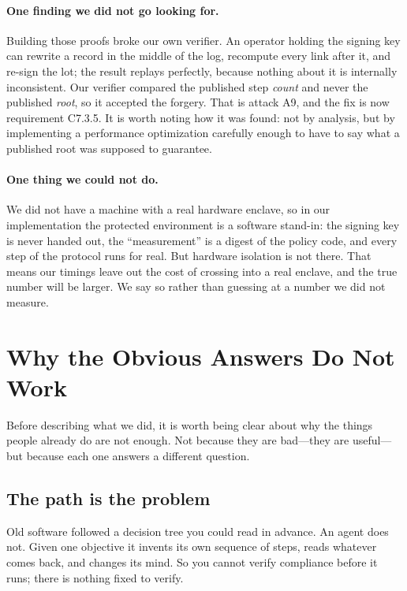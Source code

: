 \documentclass[11pt]{article}
\begin{document}
\paragraph{One finding we did not go looking for.} Building those proofs broke
our own verifier. An operator holding the signing key can rewrite a record in
the middle of the log, recompute every link after it, and re-sign the lot; the
result replays perfectly, because nothing about it is internally inconsistent.
Our verifier compared the published step \emph{count} and never the published
\emph{root}, so it accepted the forgery. That is attack A9, and the fix is now
requirement C7.3.5. It is worth noting how it was found: not by analysis,
but by implementing a performance optimization carefully enough to
have to say what a published root was supposed to guarantee.

\paragraph{One thing we could not do.} We did not have a machine with a real
hardware enclave, so in our implementation the protected environment is a
software stand-in: the signing key is never handed out, the ``measurement'' is
a digest of the policy code, and every step of the protocol runs for real. But
hardware isolation is not there. That means our timings leave out the cost of
crossing into a real enclave, and the true number will be larger. We say so
rather than guessing at a number we did not measure.

\section{Why the Obvious Answers Do Not Work}
\label{sec:background}

Before describing what we did, it is worth being clear about why the things
people already do are not enough. Not because they are bad---they are
useful---but because each one answers a different question.

\subsection{The path is the problem}
\label{sec:path}

Old software followed a decision tree you could read in advance. An agent does
not. Given one objective it invents its own sequence of steps, reads whatever
comes back, and changes its mind. So you cannot verify compliance before it
runs; there is nothing fixed to verify.
\end{document}

